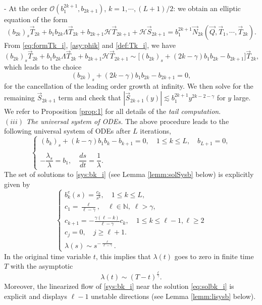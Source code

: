 \documentclass[11pt]{aims}
\theoremstyle{definition}
\numberwithin{equation}{section}
\begin{document}
\noindent - At the order ${\mathcal{O}}(b_1^{2k+1}, b_{2k+1})$, $k = 1, \cdots, (L+1)/2$: we obtain an elliptic equation of the form
$$(b_{2k})_s\vec T_{2k} + b_1b_{2k}\Lambda \vec T_{2k} + b_{2k+1}{\mathscr{H}} \vec T_{2k+1} + {\mathscr{H}} \vec S_{2k+1} = b_1^{2k + 1}\vec N_{2k}(\vec Q, \vec T_1, \cdots, \vec T_{2k}).$$ 
From \eqref{eq:formTk_i}, \eqref{asy:phik} and \eqref{def:Tk_i}, we have
$$(b_{2k})_s\vec T_{2k} + b_1b_{2k}\Lambda \vec T_{2k} + b_{2k + 1}{\mathscr{H}} \vec T_{2k + 1} \sim \big[(b_{2k})_s + (2k - \gamma)b_1b_{2k} - b_{2k+1}\big]\vec T_{2k},$$
which leads to the choice 
$$(b_{2k})_s + (2k - \gamma)b_1b_{2k} - b_{2k+1} = 0,$$
for the cancellation of the leading order growth at infinity. We then solve for the remaining $\vec S_{2k + 1}$ term and check that $|\vec S_{2k + 1}(y)|\lesssim b_1^{2k+1}y^{2k - 2 - \gamma}$ for $y$ large. We refer to Proposition \ref{prop:1} for all details of the \textit{tail computation}.\\

\noindent $(iii)$ \textit{The universal system of ODEs.} The above procedure leads to the following universal system of ODEs after $L$ iterations,
\begin{equation}\label{sys:bk_i}
\left\{ \begin{array}{l}
(b_k)_s + (k - \gamma)b_1b_k - b_{k+1} = 0, \quad 1 \leq k \leq L, \quad b_{L+1} = 0,\\
\quad \\
-\dfrac{\lambda_s}{\lambda} = b_1, \quad \dfrac{ds}{dt} = \dfrac{1}{\lambda}.
\end{array}\right.
\end{equation}
The set of solutions to \eqref{sys:bk_i} (see Lemma \ref{lemm:solSysb} below) is explicitly given by 
\begin{equation}\label{eq:solbk_i}
\left\{\begin{array}{l}
b_k^e(s) = \frac{c_k}{s^k}, \quad 1 \leq k \leq L,\\
c_1 = \frac{\ell}{\ell - \gamma}, \quad \ell \in \mathbb{N}, \; \ell > \gamma,\\
c_{k + 1} = -\frac{\gamma(\ell - k)}{\ell - \gamma}c_k, \quad 1 \leq k \leq \ell -1,\ell\geq 2\\
c_j = 0, \quad j \geq \ell + 1.\\
\lambda(s) \sim s^{-\frac{\ell}{\ell - \gamma}}.
\end{array}\right.
\end{equation}
In the original time variable $t$, this implies that $\lambda(t)$ goes to zero in finite time $T$ with the asymptotic 
$$\lambda(t) \sim (T-t)^\frac{\ell}{\gamma}.$$
Moreover, the linearized flow of \eqref{sys:bk_i} near the solution \eqref{eq:solbk_i} is explicit and displays $\ell - 1$ unstable directions (see Lemma \ref{lemm:lisysb} below).\\
\end{document}
